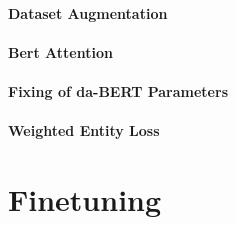 \documentclass[main.tex]{subfiles}
\begin{document}
\paragraph{Dataset Augmentation}

\paragraph{Bert Attention}

\paragraph{Fixing of da-BERT Parameters}

\paragraph{Weighted Entity Loss}

\section{Finetuning}
\label{sec:finetuning}
\end{document}
